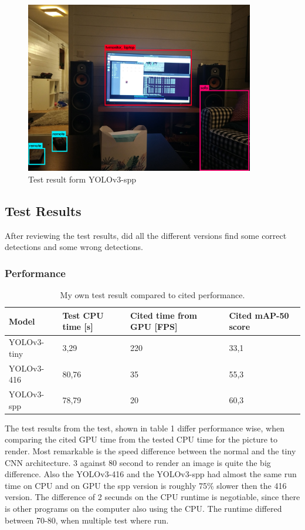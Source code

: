 \begin{figure}
    \centering
        \includegraphics[width=10cm]{experiment_files/yolov3-spp.jpg}
    \caption{Test result form YOLOv3-spp}
    \label{fig:YOLOv3_spp}
\end{figure}

\subsection{Test Results}
After reviewing the test results, did all the different versions find some correct detections and some wrong detections.

\subsubsection*{Performance}
\begin{table}[]
\begin{tabular}{l|lll}
Model       & Test CPU time {[}s{]} & Cited\cite{yolo_res} time from GPU {[}FPS{]} & Cited\cite{yolo_res} mAP-50 score  \\ \hline
YOLOv3-tiny & 3,29                  & 220                           & 33,1               \\
YOLOv3-416  & 80,76                 & 35                            & 55,3               \\
YOLOv3-spp  & 78,79                 & 20                            & 60,3              
\end{tabular}
\caption{My own test result compared to cited performance.}
\end{table}

The test results from the test, shown in table 1 differ performance wise, when comparing the cited GPU time from the tested CPU time for the picture to render. Most remarkable is the speed difference between the normal and the tiny CNN architecture. 3 against 80 second to render an image is quite the big difference. Also the YOLOv3-416 and the YOLOv3-spp had almost the same run time on CPU and on GPU the spp version is roughly 75\% slower then the 416 version. The difference of 2 secunds on the CPU runtime is negotiable, since there is other programs on the computer also using the CPU. The runtime differed between 70-80, when multiple test where run.

